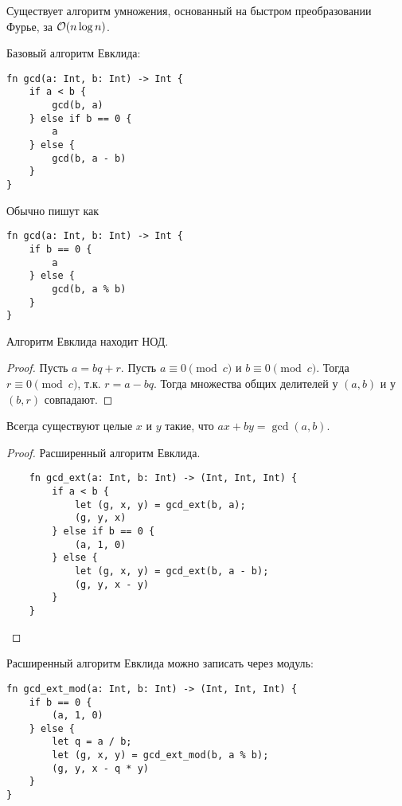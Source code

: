 Существует алгоритм умножения,
основанный на быстром преобразовании Фурье,
за $\mathcal{O}(n \log n)$.

Базовый алгоритм Евклида:
\begin{verbatim}
fn gcd(a: Int, b: Int) -> Int {
    if a < b {
        gcd(b, a)
    } else if b == 0 {
        a
    } else {
        gcd(b, a - b)
    }
}
\end{verbatim}

Обычно пишут как
\begin{verbatim}
fn gcd(a: Int, b: Int) -> Int {
    if b == 0 {
        a
    } else {
        gcd(b, a % b)
    }
}
\end{verbatim}

\begin{theorem}
    Алгоритм Евклида находит НОД.
\end{theorem}
\begin{proof}
    Пусть $a = bq + r$.
    Пусть $a \equiv 0 \pmod c$
    и $b \equiv 0 \pmod c$.
    Тогда $r \equiv 0 \pmod c$,
    т.к. $r = a - bq$.
    Тогда множества общих делителей
    у $(a, b)$ и у $(b, r)$ совпадают.
\end{proof}

\begin{theorem}
    Всегда существуют целые $x$ и $y$
    такие, что $ax + by = \gcd(a, b)$.
\end{theorem}
\begin{proof}
    Расширенный алгоритм Евклида.
    \begin{verbatim}
    fn gcd_ext(a: Int, b: Int) -> (Int, Int, Int) {
        if a < b {
            let (g, x, y) = gcd_ext(b, a);
            (g, y, x)
        } else if b == 0 {
            (a, 1, 0)
        } else {
            let (g, x, y) = gcd_ext(b, a - b);
            (g, y, x - y)
        }
    }
    \end{verbatim}
\end{proof}

Расширенный алгоритм Евклида можно записать через модуль:
\begin{verbatim}
fn gcd_ext_mod(a: Int, b: Int) -> (Int, Int, Int) {
    if b == 0 {
        (a, 1, 0)
    } else {
        let q = a / b;
        let (g, x, y) = gcd_ext_mod(b, a % b);
        (g, y, x - q * y)
    }
}
\end{verbatim}


